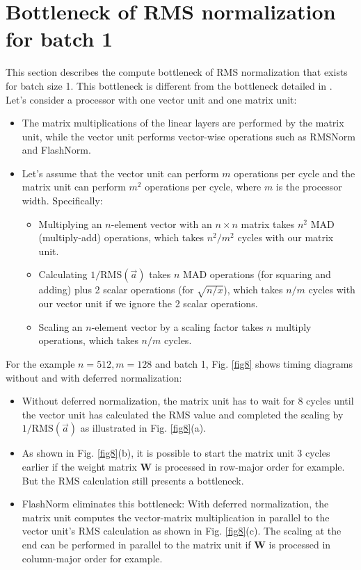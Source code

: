 \documentclass{article}
\newcommand{\mat}[1]{\mathbf{#1}}     %
\def\rms{\text{RMS}(\vec{a})}         %
\begin{document}
\section{Bottleneck of RMS normalization for batch 1}
This section describes the compute bottleneck of RMS normalization that exists for batch size 1. This bottleneck is different from the bottleneck detailed in \citep{openelm}. Let’s consider a processor with one vector unit and one matrix unit:
\begin{itemize}[topsep=-1pt]
  \item The matrix multiplications of the linear layers are performed by the matrix unit, while the vector unit performs vector-wise operations such as RMSNorm and FlashNorm.
  \item Let’s assume that the vector unit can perform $m$ operations per cycle and the matrix unit can perform $m^2$ operations per cycle, where $m$ is the processor width. Specifically:
  \begin{itemize}[topsep=-1pt]
    \item Multiplying an $n$-element vector with an $n \times n$ matrix takes $n^2$ MAD (multiply-add) operations, which takes $n^2/m^2$ cycles with our matrix unit.
    \item Calculating $1/\rms$ takes $n$ MAD operations (for squaring and adding) plus 2 scalar operations (for $\sqrt{n/x}$), which takes $n/m$ cycles with our vector unit if we ignore the 2 scalar operations.
    \item Scaling an $n$-element vector by a scaling factor takes $n$ multiply operations, which takes $n/m$ cycles.
  \end{itemize}
\end{itemize}

For the example $n = 512, m = 128$ and batch 1, Fig. \ref{fig8} shows timing diagrams without and with deferred normalization:
\begin{itemize}[topsep=-1pt]
  \item Without deferred normalization, the matrix unit has to wait for 8 cycles until the vector unit has calculated the RMS value and completed the scaling by $1/ \rms$ as illustrated in Fig. \ref{fig8}(a).
  \item As shown in Fig. \ref{fig8}(b), it is possible to start the matrix unit 3 cycles earlier if the weight matrix $\mat{W}$ is processed in row-major order for example. But the RMS calculation still presents a bottleneck.
  \item FlashNorm eliminates this bottleneck: With deferred normalization, the matrix unit computes the vector-matrix multiplication in parallel to the vector unit's RMS calculation as shown in Fig. \ref{fig8}(c). The scaling at the end can be performed in parallel to the matrix unit if $\mat{W}$ is processed in column-major order for example.
\end{itemize}
\end{document}
